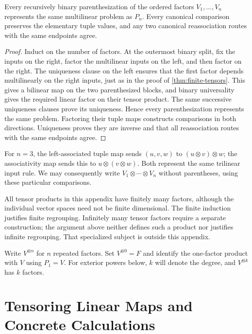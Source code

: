 \begin{corollary}\label{thm:all-parenthesizations}
Every recursively binary parenthesization of the ordered factors
$V_1,\ldots,V_n$ represents the same multilinear problem as $P_n$.
Every canonical comparison preserves the elementary tuple values, and
any two canonical reassociation routes with the same endpoints agree.
\end{corollary}
\begin{proof}
Induct on the number of factors. At the outermost binary split, fix the
inputs on the right, factor the multilinear inputs on the left, and then
factor on the right. The uniqueness clause on the left ensures that the
first factor depends multilinearly on the right inputs, just as in the
proof of \cref{thm:finite-tensors}. This gives a bilinear map on the two
parenthesized blocks, and binary universality gives the required linear
factor on their tensor product. The same successive uniqueness clauses
prove its uniqueness. Hence every parenthesization represents the same
problem. Factoring their tuple maps constructs comparisons in both
directions. Uniqueness proves they are inverse and that all reassociation
routes with the same endpoints agree.
\end{proof}
For $n=3$, the left-associated tuple map sends $(u,v,w)$ to
$(u\otimes v)\otimes w$; the associativity map sends this to
$u\otimes(v\otimes w)$. Both represent the same trilinear input rule.
We may consequently write $V_1\otimes\cdots\otimes V_n$ without
parentheses, using these particular comparisons.

\begin{remark}
All tensor products in this appendix have finitely many factors, although
the individual vector spaces need not be finite dimensional. The finite
induction justifies finite regrouping. Infinitely many tensor factors
require a separate construction; the argument above neither defines
such a product nor justifies infinite regrouping. That specialized subject
is outside this appendix.
\end{remark}
\begin{definition}
Write $V^{\otimes n}$ for $n$ repeated factors. Set $V^{\otimes0}=F$
and identify the one-factor product with $V$ using $P_1=V$. For exterior powers below, $k$ will
denote the degree, and $V^{\otimes k}$ has $k$ factors.
\end{definition}

\section{Tensoring Linear Maps and Concrete Calculations}

